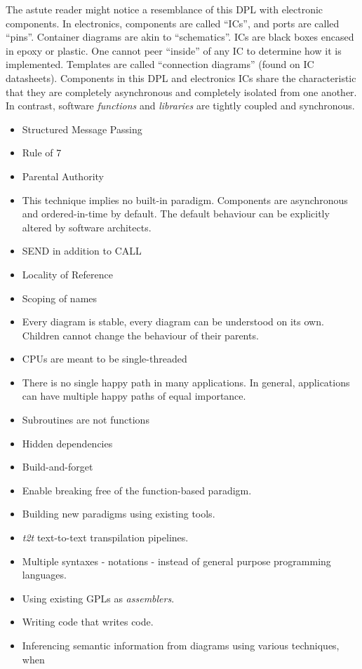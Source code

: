 The astute reader might notice a resemblance of this DPL with electronic components. In electronics, components are called “ICs”, and ports are called “pins”. Container diagrams are akin to “schematics”. ICs are black boxes encased in epoxy or plastic. One cannot peer “inside” of any IC to determine how it is implemented. Templates are called “connection diagrams” (found on IC datasheets). Components in this DPL and electronics ICs share the characteristic that they are completely asynchronous and completely isolated from one another. In contrast, software \emph{functions} and \emph{libraries} are tightly coupled and synchronous.

\begin{itemize}
\item Structured Message Passing
\item Rule of 7
\item Parental Authority
\item This technique implies no built-in paradigm. Components are asynchronous and ordered-in-time by default. 
The default behaviour can be explicitly altered by software architects.
\item SEND in addition to CALL
\item Locality of Reference
\item Scoping of names
\item Every diagram is stable, every diagram can be understood on its own.
Children cannot change the behaviour of their parents.
\item CPUs are meant to be single-threaded
\item There is no single happy path in many applications.
In general, applications can have multiple happy paths of equal importance.
\item Subroutines are not functions
\item Hidden dependencies
\item Build-and-forget
\item Enable breaking free of the function-based
paradigm.
\item Building new paradigms using existing tools.
\item \emph{t2t} text-to-text transpilation pipelines.
\item Multiple syntaxes - notations - instead of general purpose programming languages.
\item Using existing GPLs as \emph{assemblers}.
\item Writing code that writes code.
\item Inferencing semantic information from diagrams using various techniques, when 

\end{itemize}
